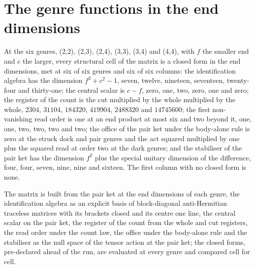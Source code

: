 \section{The genre functions in the end dimensions}\label{mod:I-2-D542526-gnfn-t1}
\begin{chtheorem}\label{box:I-2-D542526-gnfn-t1:1}
At the six genres, (2,2), (2,3), (2,4), (3,3), (3,4) and (4,4), with $f$ the smaller end and $c$ the larger, every structural cell of the matrix is a closed form in the end dimensions, met at six of six genres and six of six columns: the identification algebra has the dimension $f^{2} + c^{2} - 1$, seven, twelve, nineteen, seventeen, twenty-four and thirty-one; the central scalar is $c - f$, zero, one, two, zero, one and zero; the register of the count is the cut multiplied by the whole multiplied by the whole, $2304$, $31104$, $184320$, $419904$, $2488320$ and $14745600$; the first non-vanishing read order is one at an end product at most six and two beyond it, one, one, two, two, two and two; the office of the pair ket under the body-alone rule is zero at the struck dock and pair genres and the act squared multiplied by one plus the squared read at order two at the dark genres; and the stabiliser of the pair ket has the dimension $f^{2}$ plus the special unitary dimension of the difference, four, four, seven, nine, nine and sixteen. The first column with no closed form is none.
\end{chtheorem}
The matrix is built from the pair ket at the end dimensions of each genre, the identification algebra as an explicit basis of block-diagonal anti-Hermitian traceless matrices with its brackets closed and its centre one line, the central scalar on the pair ket, the register of the count from the whole and cut registers, the read order under the count law, the office under the body-alone rule and the stabiliser as the null space of the tensor action at the pair ket; the closed forms, pre-declared ahead of the run, are evaluated at every genre and compared cell for cell.
